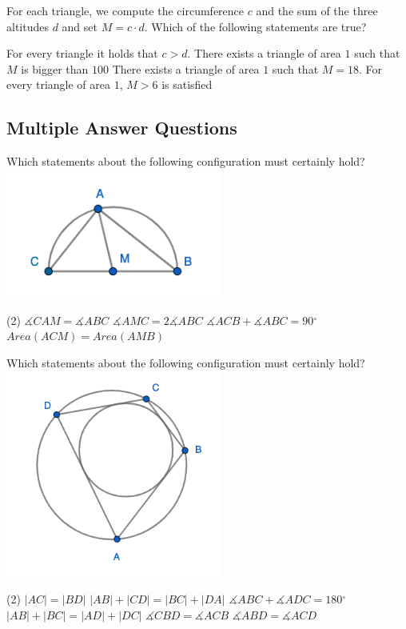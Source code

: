 \documentclass{article}
\newcommand{\degree}{\ensuremath{^{\circ}}}
\renewcommand{\angle}{\measuredangle}
\begin{document}
\begin{problem}
For each triangle, we compute the circumference $c$ and the sum of the three altitudes $d$ and set $M=c \cdot d$. Which of the following statements are true?
\end{problem}
\begin{tasks2}
\task For every triangle it holds that $c > d$.
\task There exists a triangle of area $1$ such that $M$ is bigger than $100$
\task There exists a triangle of area $1$ such that $M=18$.
\task For every triangle of area $1$, $M>6$ is satisfied
\end{tasks2}

\subsection{Multiple Answer Questions}

\begin{problem}
Which statements about the following configuration must certainly hold?\\
\includegraphics[width=200pt]{img1}
\begin{tasks2}(2)
\task $\angle CAM = \angle ABC$
\task $\angle AMC = 2\angle ABC$
\task $\angle ACB + \angle ABC = 90\degree$
\task $Area(ACM) = Area(AMB)$
\end{tasks2}
\end{problem}

\begin{problem}
Which statements about the following configuration must certainly hold?\\
\includegraphics[width=200pt]{img2}
\begin{tasks}(2)
\task $|AC| = |BD|$
\task $|AB|+|CD| = |BC|+|DA|$
\task $\angle ABC +\angle ADC = 180\degree$
\task $|AB|+|BC| = |AD|+|DC|$
\task $\angle CBD = \angle ACB$
\task $\angle ABD = \angle ACD$
\end{tasks}
\end{problem}
\end{document}
